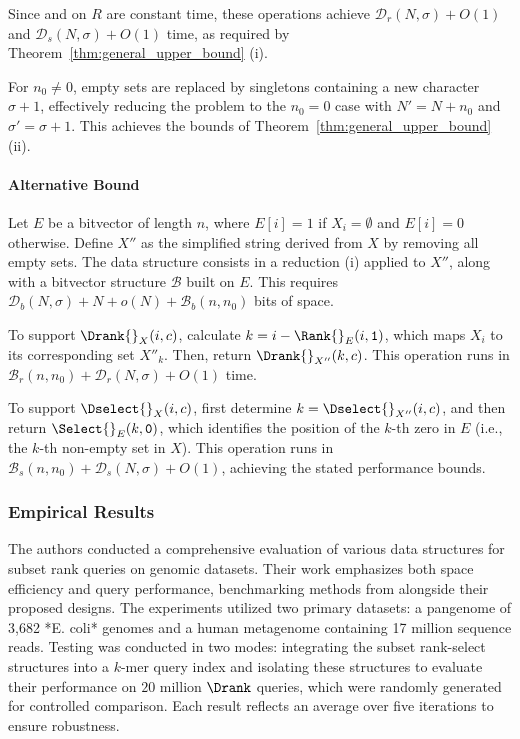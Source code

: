 \noindent Since \Rank{} and \Select{} on $R$ are constant time, these operations achieve $\mathcal{D}_r(N,\sigma) + O(1)$ and $\mathcal{D}_s(N,\sigma) + O(1)$ time, as required by Theorem~\ref{thm:general_upper_bound} (i).


\noindent For $n_0 \neq 0$, empty sets are replaced by singletons containing a new character $\sigma + 1$, effectively reducing the problem to the $n_0 = 0$ case with $N' = N + n_0$ and $\sigma' = \sigma + 1$. This achieves the bounds of Theorem~\ref{thm:general_upper_bound} (ii).

\paragraph{Alternative Bound} Let $E$ be a bitvector of length $n$, where $E[i] = 1$ if $X_i = \emptyset$ and $E[i] = 0$ otherwise. Define $X''$ as the simplified string derived from $X$ by removing all empty sets. The data structure consists in a reduction (i) applied to $X''$, along with a bitvector structure $\mathcal{B}$ built on $E$. This requires $\mathcal{D}_b(N, \sigma) + N + o(N) + \mathcal{B}_b(n, n_0)$ bits of space.

\noindent To support $\Drank{}_X(i, c)$, calculate $k = i - \Rank{}_E(i, \texttt{1})$, which maps $X_i$ to its corresponding set $X''_{k}$. Then, return $\Drank{}_{X''}(k, c)$. This operation runs in $\mathcal{B}_r(n, n_0) + \mathcal{D}_r(N, \sigma) + O(1)$ time.

\noindent To support $\Dselect{}_X(i, c)$, first determine $k = \Dselect{}_{X''}(i, c)$, and then return $\Select{}_E(k, \texttt{0})$, which identifies the position of the $k$-th zero in $E$ (i.e., the $k$-th non-empty set in $X$). This operation runs in $\mathcal{B}_s(n, n_0) + \mathcal{D}_s(N, \sigma) + O(1)$, achieving the stated performance bounds.

\subsubsection*{Empirical Results}
The authors conducted a comprehensive evaluation of various data structures for subset rank queries on genomic datasets. Their work emphasizes both space efficiency and query performance, benchmarking methods from \cite{SubsetWT} alongside their proposed designs. The experiments utilized two primary datasets: a pangenome of 3,682 *E. coli* genomes and a human metagenome containing 17 million sequence reads. Testing was conducted in two modes: integrating the subset rank-select structures into a $k$-mer query index and isolating these structures to evaluate their performance on $20$ million $\Drank$ queries, which were randomly generated for controlled comparison. Each result reflects an average over five iterations to ensure robustness.

